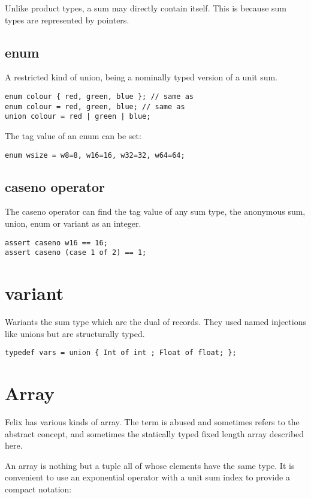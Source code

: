 \documentclass[oneside]{book}
\begin{document}
Unlike product types, a sum may directly contain itself.
This is because sum types are represented by pointers.

\subsection{enum}
A restricted kind of union, being a nominally typed version
of a unit sum.

\begin{verbatim}
enum colour { red, green, blue }; // same as
enum colour = red, green, blue; // same as
union colour = red | green | blue;
\end{verbatim}


The tag value of an enum can be set:

\begin{verbatim}
enum wsize = w8=8, w16=16, w32=32, w64=64;
\end{verbatim}


\subsection{caseno operator}
The caseno operator can find the tag value of any sum type,
the anonymous sum, union, enum or variant as an integer.

\begin{verbatim}
assert caseno w16 == 16;
assert caseno (case 1 of 2) == 1;
\end{verbatim}


\section{variant}
Wariants the sum type which are the dual of records.
They used named injections like unions but are structurally typed.

\begin{verbatim}
typedef vars = union { Int of int ; Float of float; };
\end{verbatim}


\section{Array}
Felix has various kinds of array. The term is abused and sometimes
refers to the abstract concept, and sometimes the statically
typed fixed length array described here.

An array is nothing but a tuple all of whose elements have the
same type. It is convenient to use an exponential operator with
a  unit sum index to provide a compact notation:
\end{document}
